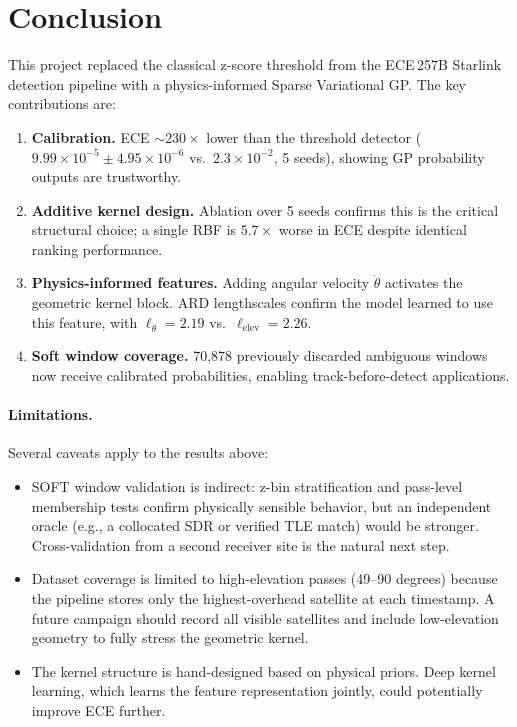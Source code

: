 \documentclass{article}
\begin{document}
\section{Conclusion}

This project replaced the classical z-score threshold from the ECE\,257B Starlink
detection pipeline with a physics-informed Sparse Variational GP. The key
contributions are:

\begin{enumerate}
  \item \textbf{Calibration.} ECE $\sim230\times$ lower than the threshold detector
        ($9.99\times10^{-5} \pm 4.95\times10^{-6}$ vs.\ $2.3\!\times\!10^{-2}$, 5 seeds),
        showing GP probability outputs are trustworthy.
  \item \textbf{Additive kernel design.} Ablation over 5 seeds confirms this is the
        critical structural choice; a single RBF is $5.7\times$ worse in ECE despite
        identical ranking performance.
  \item \textbf{Physics-informed features.} Adding angular velocity $\dot{\theta}$
        activates the geometric kernel block. ARD lengthscales confirm the model
        learned to use this feature, with $\ell_{\dot{\theta}} = 2.19$ vs.\
        $\ell_{\text{elev}} = 2.26$.
  \item \textbf{Soft window coverage.} 70,878 previously discarded ambiguous windows
        now receive calibrated probabilities, enabling track-before-detect applications.
\end{enumerate}

\paragraph{Limitations.}
Several caveats apply to the results above:
\begin{itemize}
  \item SOFT window validation is indirect: z-bin stratification and pass-level
        membership tests confirm physically sensible behavior, but an independent
        oracle (e.g., a collocated SDR or verified TLE match) would be stronger.
        Cross-validation from a second receiver site is the natural next step.
  \item Dataset coverage is limited to high-elevation passes (49--90 degrees)
        because the pipeline stores only the highest-overhead satellite at each
        timestamp. A future campaign should record all visible satellites and
        include low-elevation geometry to fully stress the geometric kernel.
  \item The kernel structure is hand-designed based on physical priors. Deep
        kernel learning, which learns the feature representation jointly, could
        potentially improve ECE further.
\end{itemize}
\end{document}
